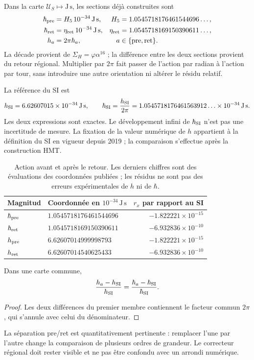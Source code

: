 Dans la carte \(\mathcal U_S\mapsto\mathrm{J\,s}\), les sections déjà
construites sont
\begin{align}
 \hbar_{\rm pre}&=H_5\,10^{-34}\,\mathrm{J\,s},&
 H_5&=1.0545718176461544696\ldots,\\
 \hbar_{\rm ret}&=\eta_{\rm ret}\,10^{-34}\,\mathrm{J\,s},&
 \eta_{\rm ret}&=1.0545718169150390611\ldots,\\
 h_a&=2\pi\hbar_a,&a&\in\{\mathrm{pre},\mathrm{ret}\}.
 \label{ii:eq:ii-cuatro-coordenadas-planck}
\end{align}
La décade provient de \(\Sigma_H=\varphi\alpha^{16}\) ; la différence entre
les deux sections provient du retour régional. Multiplier par \(2\pi\)
fait passer de l’action par radian à l’action par tour, sans introduire une autre
orientation ni altérer le résidu relatif.

La référence du SI est
\[
 h_{\rm SI}=6.62607015\times10^{-34}\,\mathrm{J\,s},\qquad
 \hbar_{\rm SI}=\frac{h_{\rm SI}}{2\pi}
 =1.0545718176461563912\ldots\times10^{-34}\,\mathrm{J\,s}.
\]
Les deux expressions sont exactes. Le développement infini de \(\hbar_{\rm SI}\)
n’est pas une incertitude de mesure. La fixation de la valeur numérique de
\(h\) appartient à la définition du SI en vigueur depuis 2019
\cite{ii:bipm2018} ; la comparaison s’effectue après la construction HMT.

\begin{table}[htbp]
\centering\small
\setlength{\tabcolsep}{5pt}
\begin{tabular}{@{}llr@{}}
\toprule
Magnitud & Coordonnée en \(10^{-34}\,\mathrm{J\,s}\) & \(r_x\) par rapport au SI\\
\midrule
\(\hbar_{\rm pre}\) & \(1.0545718176461544696\) & \(-1.822221\times10^{-15}\)\\
\(\hbar_{\rm ret}\) & \(1.0545718169150390611\) & \(-6.932836\times10^{-10}\)\\
\(h_{\rm pre}\) & \(6.62607014999998793\) & \(-1.822221\times10^{-15}\)\\
\(h_{\rm ret}\) & \(6.62607014540625433\) & \(-6.932836\times10^{-10}\)\\
\bottomrule
\end{tabular}
\caption{Action avant et après le retour. Les derniers chiffres sont des
évaluations des coordonnées publiées ; les résidus ne sont pas des erreurs
expérimentales de \(h\) ni de \(\hbar\).}
\label{ii:tab:ii-planck-comparacion}
\end{table}

\begin{proposition}
Dans une carte commune,
\[
 \frac{h_a-h_{\rm SI}}{h_{\rm SI}}
 =\frac{\hbar_a-\hbar_{\rm SI}}{\hbar_{\rm SI}}.
\]
\end{proposition}
\begin{proof}
Les deux différences du premier membre contiennent le facteur commun
\(2\pi\), qui s’annule avec celui du dénominateur.
\end{proof}
La séparation pre/ret est quantitativement pertinente : remplacer l’une par
l’autre change la comparaison de plusieurs ordres de grandeur. Le correcteur
régional doit rester visible et ne pas être confondu avec un arrondi numérique.

